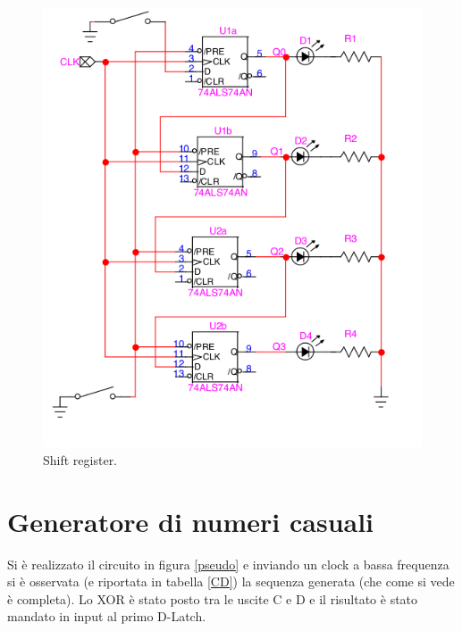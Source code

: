 \documentclass[10pt,a4paper]{article}
\begin{document}
\begin{figure}
\centering
\includegraphics[scale=0.5]{shift.png}
\caption{Shift register.\label{shift}}
\end{figure}

\section{Generatore di numeri casuali}
Si è realizzato il circuito in figura \ref{pseudo} e inviando un clock a bassa frequenza si è osservata (e riportata in tabella \ref{CD}) la sequenza generata (che come si vede è completa). 
Lo XOR è stato posto tra le uscite C e D e il risultato è stato mandato in input al primo  D-Latch.\\
\end{document}

